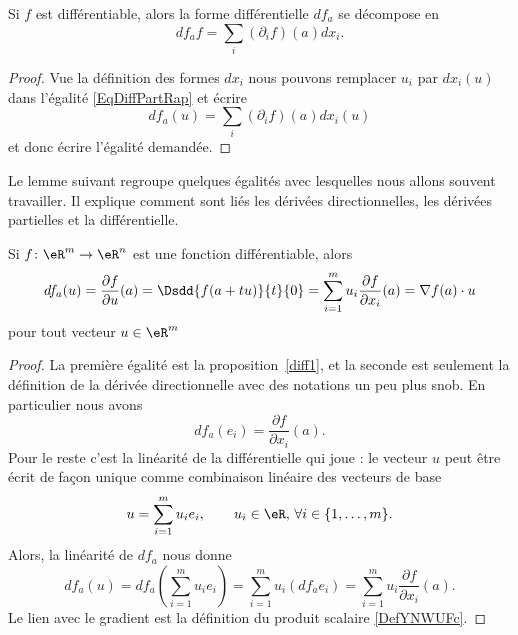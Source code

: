 \begin{corollary}       \label{CORooXURPooQMKvBl}
    Si \( f\) est différentiable, alors la forme différentielle \( df_a\) se décompose en
    \begin{equation}
        df_af=\sum_i(\partial_if)(a)dx_i.
    \end{equation}
\end{corollary}

\begin{proof}
    Vue la définition des formes \( dx_i\) nous pouvons remplacer \( u_i\) par \( dx_i(u)\) dans l'égalité \eqref{EqDiffPartRap} et écrire
    \begin{equation}
        df_a(u)=\sum_i(\partial_if)(a)dx_i(u)
    \end{equation}
    et donc écrire l'égalité demandée.
\end{proof}

Le lemme suivant regroupe quelques égalités avec lesquelles nous allons souvent travailler. Il explique comment sont liés les dérivées directionnelles, les dérivées partielles et la différentielle.
\begin{lemma}		\label{LemdfaSurLesPartielles}
	Si $f\colon \eR^m\to \eR^n$ est une fonction différentiable, alors
	\begin{equation}
        df_a(u)=\frac{ \partial f }{ \partial u }(a)=\Dsdd{ f(a+tu) }{t}{0}=\sum_{i=1}^mu_i\frac{ \partial f }{ \partial x_i }(a)=\nabla f(a)\cdot u
	\end{equation}
	pour tout vecteur $u\in\eR^m$
\end{lemma}

\begin{proof}
La première égalité est la proposition~\ref{diff1}, et la seconde est seulement la définition de la dérivée directionnelle avec des notations un peu plus snob. En particulier nous avons
\begin{equation}
    df_a(e_i)=\frac{ \partial f }{ \partial x_i }(a).
\end{equation}
Pour le reste c'est la linéarité de la différentielle qui joue : le vecteur $u$ peut être écrit de façon unique comme combinaison linéaire des vecteurs de base
\[
u=\sum_{i=1}^{m}u_i e_i, \qquad  u_i\in\eR,\, \forall i\in\{1,\ldots, m\}.
\]
Alors, la linéarité de $df_a$ nous donne
\begin{equation}
     df_a(u)= df_a\left(\sum_{i=1}^{m}u_i e_i\right)
=\sum_{i=1}^{m}u_i \left(df_ae_i\right)
=\sum_{i=1}^{m}u_i \frac{ \partial f }{ \partial x_i }(a).
 \end{equation}
Le lien avec le gradient est la définition du produit scalaire \eqref{DefYNWUFc}.
\end{proof}

